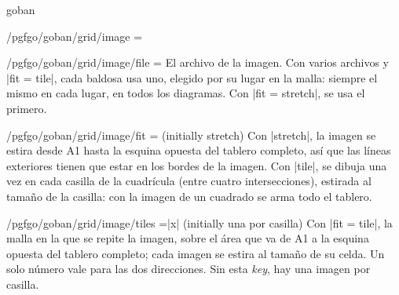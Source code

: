 \begin{environment}{{goban}}
\begin{key}{/pgfgo/goban/grid/image =}
		\begin{codeexample}[]
			\begin{goban}[9, grid = {image = {file = pgfgo-grid.png}}, hoshi = false]
			\end{goban}

			\begin{goban}[9, grid = {image = {file = pgfgo-grid.png}}, hoshi = false, partial = C3:G7]
			\end{goban}
		\end{codeexample}
	\end{key}

	\begin{key}{/pgfgo/goban/grid/image/file =}
		El archivo de la imagen. Con varios archivos y |fit = tile|, cada baldosa usa uno, elegido por su lugar en la malla: siempre el mismo en cada lugar, en todos los diagramas. Con |fit = stretch|, se usa el primero.

		\begin{codeexample}[]
			\begin{goban}[5, hoshi = false,
				grid = {image = {file = {pgfgo-cell.png, pgfgo-tile.png}, fit = tile}}]
			\end{goban}
		\end{codeexample}
	\end{key}

	\begin{key}{/pgfgo/goban/grid/image/fit = (initially stretch)}
		Con |stretch|, la imagen se estira desde A1 hasta la esquina opuesta del tablero completo, así que las líneas exteriores tienen que estar en los bordes de la imagen. Con |tile|, se dibuja una vez en cada casilla de la cuadrícula (entre cuatro intersecciones), estirada al tamaño de la casilla: con la imagen de un cuadrado se arma todo el tablero.

		\begin{codeexample}[]
			\begin{goban}[9, grid = {image = {file = pgfgo-cell.png, fit = tile}}, hoshi = false]
			\end{goban}
		\end{codeexample}
	\end{key}

	\begin{key}{/pgfgo/goban/grid/image/tiles =|x| (initially una por casilla)}
		Con |fit = tile|, la malla en la que se repite la imagen, sobre el área que va de A1 a la esquina opuesta del tablero completo; cada imagen se estira al tamaño de su celda. Un solo número vale para las dos direcciones. Sin esta \emph{key}, hay una imagen por casilla.


\end{key}
\end{environment}
